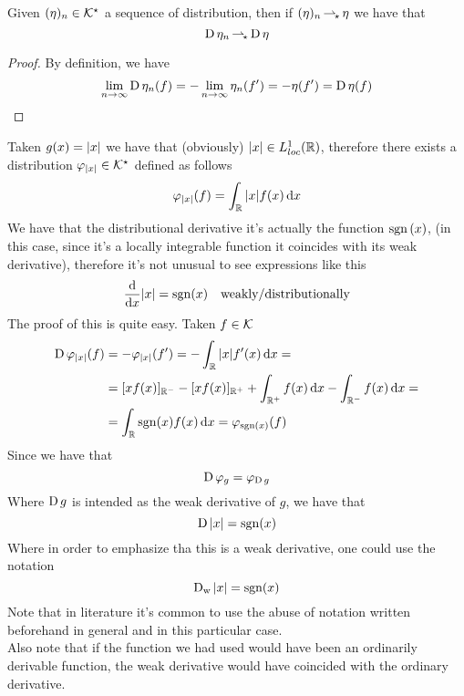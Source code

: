 \documentclass[../complete.tex]{subfiles}
\begin{document}
\begin{thm}
	Given $(\eta)_n\in\mathcal{K}^\star$ a sequence of distribution, then if $(\eta)_n\operatorname{\rightharpoonup_{\!\star}}\eta$ we have that
	\begin{equation*}
		\operatorname{\mathrm{D}}\eta_n\operatorname{\rightharpoonup_{\!\star}}\operatorname{\mathrm{D}}\eta
	\end{equation*}
\end{thm}
\begin{proof}
	By definition, we have
	\begin{equation*}
		\lim_{n\to\infty}\operatorname{\mathrm{D}}\eta_n(f)=-\lim_{n\to\infty}\eta_n(f')=-\eta(f')=\operatorname{\mathrm{D}}\eta(f)
	\end{equation*}
\end{proof}
\begin{eg}
	Taken $g(x)=\abs{x}$ we have that (obviously) $\abs{x}\in L^1_{loc}(\mathbb{R})$, therefore there exists a distribution $\varphi_{\abs{x}}\in\mathcal{K}^\star$ defined as follows
	\begin{equation*}
		\varphi_{\abs{x}}(f)=\int_{\mathbb{R}}^{}\abs{x}f(x)\operatorname{d\!} x
	\end{equation*}
	We have that the distributional derivative it's actually the function $\operatorname{sgn}{(x)}$, (in this case, since it's a locally integrable function it coincides with its weak derivative), therefore it's not unusual to see expressions like this
	\begin{equation*}
		\derivative{x}\abs{x}=\sgn(x)\quad\text{weakly/distributionally}
	\end{equation*}
	The proof of this is quite easy. Taken $f\in\mathcal{K}$
	\begin{equation*}
		\begin{aligned}
			\operatorname{\mathrm{D}}\varphi_{\abs{x}}(f)&=-\varphi_{\abs{x}}(f')=-\int_{\mathbb{R}}^{}\abs{x}f'(x)\operatorname{d\!} x=\\
			&=[xf(x)]_{\mathbb{R}^-}-[xf(x)]_{\mathbb{R}^+}+\int_{\mathbb{R}^+}^{}f(x)\operatorname{d\!} x-\int_{\mathbb{R}^-}^{}f(x)\operatorname{d\!} x=\\
			&=\int_{\mathbb{R}}^{}\operatorname{sgn}(x)f(x)\operatorname{d\!} x=\varphi_{\operatorname{sgn}(x)}(f)
		\end{aligned}
	\end{equation*}
	Since we have that
	\begin{equation*}
		\operatorname{\mathrm{D}}\varphi_{g}=\varphi_{\operatorname{\mathrm{D}} g}
	\end{equation*}
	Where $\operatorname{\mathrm{D}} g$ is intended as the weak derivative of $g$, we have that
	\begin{equation*}
		\operatorname{\mathrm{D}}\abs{x}=\operatorname{sgn}(x)
	\end{equation*}
	Where in order to emphasize tha this is a weak derivative, one could use the notation
	\begin{equation*}
		\operatorname{\mathrm{D}}_{\mathrm{w}}\abs{x}=\operatorname{sgn}(x)
	\end{equation*}
	Note that in literature it's common to use the abuse of notation written beforehand in general and in this particular case.\\
	Also note that if the function we had used would have been an ordinarily derivable function, the weak derivative would have coincided with the ordinary derivative.
\end{eg}
\end{document}
